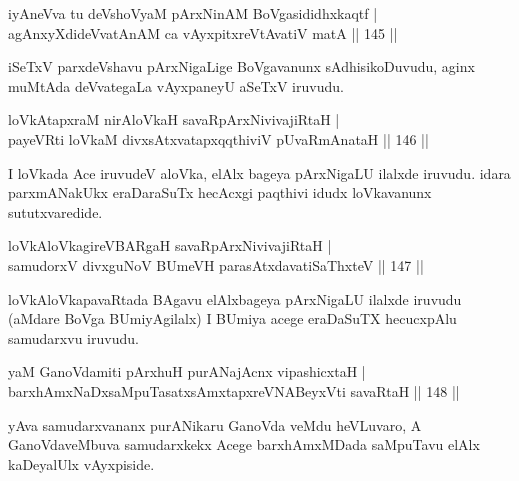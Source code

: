 
\begin{shl}
iyAneVva tu deVshoV\s yaM pArxNinAM BoVgasididhxkaqtf |\\
agAnxyXdideVvatAnAM ca vAyxpitxreVtAvatiV matA \hfill || 145 ||
\end{shl}

\begin{artha}
iSeTxV parxdeVshavu pArxNigaLige BoVgavanunx sAdhisikoDuvudu, aginx muMtAda deVvategaLa vAyxpaneyU aSeTxV iruvudu.
\end{artha}


\begin{shl}
loVkAtapxraM nirAloVkaH savaRpArxNivivajiRtaH |\\
payeVRti loVkaM divxsAtxvatapxqqthiviV pUvaRmAnataH \hfill || 146 ||
\end{shl}

\begin{artha}
I loVkada Ace iruvudeV aloVka, elAlx bageya pArxNigaLU ilalxde iruvudu. idara parxmANakUkx eraDaraSuTx hecAcxgi paqthivi idudx loVkavanunx sututxvaredide.
\end{artha}

\begin{shl}
loVkAloVkagireVBARgaH savaRpArxNivivajiRtaH |\\
samudorxV divxguNoV BUmeVH parasAtxdavatiSaThxteV \hfill || 147 ||
\end{shl}

\begin{artha}
loVkAloVkapavaRtada BAgavu elAlxbageya pArxNigaLU ilalxde iruvudu (aMdare BoVga BUmiyAgilalx) I BUmiya acege eraDaSuTX hecucxpAlu samudarxvu iruvudu.
\end{artha}

\begin{shl}
\footnotemark{}yaM GanoVdamiti pArxhuH purANajAcnx vipashicxtaH |\\
barxhAmxNaDxsaMpuTasatxsAmxtapxreVNABeyxVti savaRtaH \hfill || 148 ||
\end{shl}

\begin{artha}
yAva samudarxvananx purANikaru GanoVda veMdu heVLuvaro, A GanoVdaveMbuva samudarxkekx Acege barxhAmxMDada saMpuTavu elAlx kaDeyalUlx vAyxpiside.
\end{artha}

